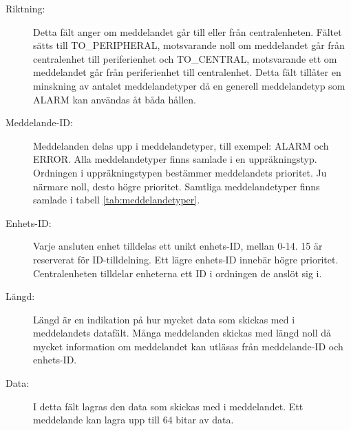 \documentclass[a4paper]{article}
\begin{document}
\begin{description}
    \item[Riktning:] Detta fält anger om meddelandet går till eller från centralenheten.
    Fältet sätts till TO\_PERIPHERAL, motsvarande noll om meddelandet går från centralenhet till periferienhet och TO\_CENTRAL, motsvarande ett om meddelandet går från periferienhet till centralenhet.
    Detta fält tillåter en minskning av antalet meddelandetyper då en generell meddelandetyp som ALARM kan användas åt båda hållen.

    \item[Meddelande-ID:] Meddelanden delas upp i meddelandetyper, till exempel: ALARM och ERROR.
    Alla meddelandetyper finns samlade i en uppräkningstyp.
    Ordningen i uppräkningstypen bestämmer meddelandets prioritet.
    Ju närmare noll, desto högre prioritet.
    Samtliga meddelandetyper finns samlade i tabell \ref{tab:meddelandetyper}.

    \item[Enhets-ID:] Varje ansluten enhet tilldelas ett unikt enhets-ID, mellan 0-14.
    15 är reserverat för ID-tilldelning. Ett lägre enhets-ID innebär högre prioritet.
    Centralenheten tilldelar enheterna ett ID i ordningen de anslöt sig i.

    \item[Längd:] Längd är en indikation på hur mycket data som skickas med i meddelandets datafält.
    Många meddelanden skickas med längd noll då mycket information om meddelandet kan utläsas från meddelande-ID och enhets-ID.

    \item[Data:] I detta fält lagras den data som skickas med i meddelandet.
    Ett meddelande kan lagra upp till 64 bitar av data.
\end{description}

\begin{table}[H]
    \centering
    \caption{Diagram över CAN-meddelandets uppbyggnad samt ett exemepl på hur ett alarm-meddelande från en periferienhet ser ut.}
    \label{tab:meddelandestruktur}

\end{table}
\end{document}
